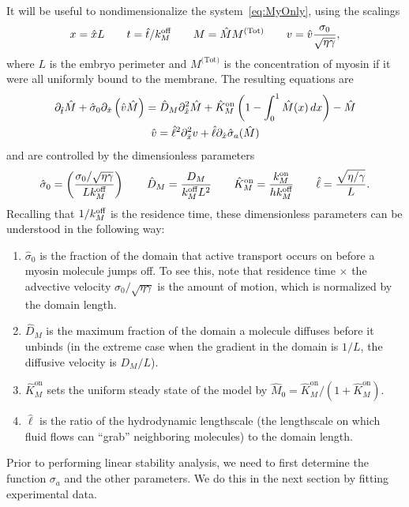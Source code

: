 \documentclass[11pt]{article}
\newcommand{\6}[1]{#1_{\text{6}}}
\newcommand{\3}[1]{#1_{\text{3}}}
\newcommand{\Tot}[1]{#1^\text{(Tot)}}
\newcommand{\My}[1]{#1_M}
\begin{document}
It will be useful to nondimensionalize the system\ \eqref{eq:MyOnly}, using the scalings
\begin{equation}
\label{eq:NDD}
x = \hat{x} L \qquad t= \hat{t}/\My{\koff} \qquad M= \hat{M}\Tot{M} \qquad v = \hat{v} \frac{\sigma_0}{\sqrt{\eta \gamma}},
\end{equation}
where $L$ is the embryo perimeter and $\Tot{M}$ is the concentration of myosin if it were all uniformly bound to the membrane. The resulting equations are 
\begin{subequations}
\label{eq:MyosinEqs}
\begin{gather}
\label{eq:MND}
\partial_{\hat{t}} \hat{M} +\hat{\sigma}_0  \partial_{\hat{x}} \left(\hat{v} \hat{M} \right) =\hat{D}_M \partial_{\hat{x}}^2 \hat{M} +\hat{K}^\text{on}_M \left(1-\int_0^1  \hat{M}(x) \, dx\right) - \hat{M}\\
\label{eq:MVND}
\hat{v} = \hat{\ell}^2 \partial_{\hat{x}}^2 v +\hat{\ell} \partial_{\hat{x}} \hat{\sigma}_a(\hat{M})
 \end{gather}
\end{subequations}
and are controlled by the dimensionless parameters
\begin{equation}
\label{eq:NDparams}
\hat{\sigma}_0 = \left(\frac{\sigma_0/ \sqrt{\eta \gamma} }{L \My{\koff}}\right)   \qquad \hat{D}_M =\frac{D_M}{\My{\koff}  L^2} \qquad \hat{K}^\text{on}_M= \frac{\My{\kon}}{h \My{\koff}} \qquad \hat{\ell} = \frac{\sqrt{\eta/\gamma}}{L}.
\end{equation}
Recalling that $1/\My{\koff}$ is the residence time, these dimensionless parameters can be understood in the following way: 
\begin{enumerate}
\item $\hat{\sigma}_0$ is the fraction of the domain that active transport occurs on before a myosin molecule jumps off. To see this, note that residence time $\times$ the advective velocity $\sigma_0 / \sqrt{\eta \gamma}$ is the amount of motion, which is normalized by the domain length.
\item $\hat{D}_M$ is the maximum fraction of the domain a molecule diffuses before it unbinds (in the extreme case when the gradient in the domain is $1/L$, the diffusive velocity is $D_M/L$). 
\item $\hat{K}^\text{on}_M$ sets the uniform steady state of the model by $\hat{M}_0= \hat{K}^\text{on}_M/\left(1+\hat{K}^\text{on}_M\right)$.
\item $\hat{\ell}$ is the ratio of the hydrodynamic lengthscale (the lengthscale on which fluid flows can ``grab'' neighboring molecules) to the domain length.
\end{enumerate}
Prior to performing linear stability analysis, we need to first determine the function $\sigma_a$ and the other parameters. We do this in the next section by fitting experimental data.
\end{document}
